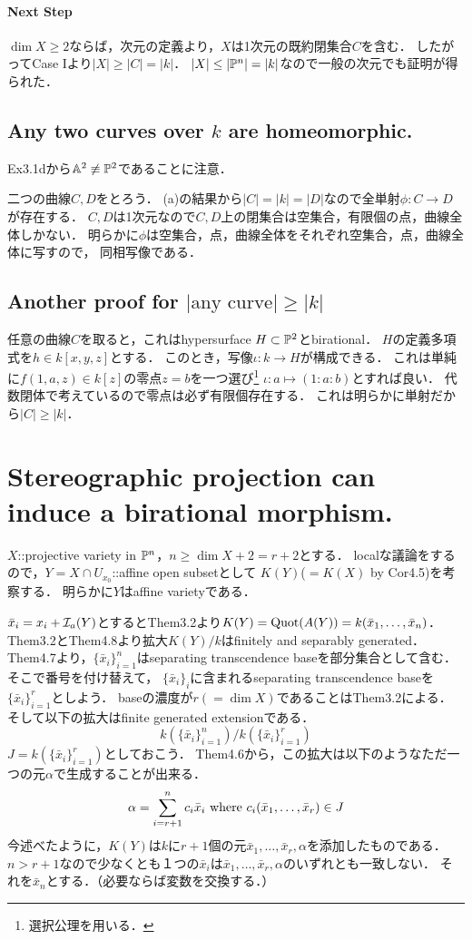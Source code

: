\documentclass[a4paper]{jsarticle}
\begin{document}
    \paragraph{Next Step}
    $\dim X \geq 2$ならば，次元の定義より，$X$は1次元の既約閉集合$C$を含む．
    したがってCase Iより$|X| \geq |C|=|k|$．
    $|X| \leq |\mathbb{P}^n|=|k|$なので一般の次元でも証明が得られた．

    \subsection{Any two curves over $k$ are homeomorphic.}
    Ex3.1dから$\mathbb{A}^2 \not \equiv \mathbb{P}^2$であることに注意．

    二つの曲線$C,D$をとろう．
    (a)の結果から$|C|=|k|=|D|$なので全単射$\phi:C \to D$が存在する．
    $C,D$は1次元なので$C,D$上の閉集合は空集合，有限個の点，曲線全体しかない．
    明らかに$\phi$は空集合，点，曲線全体をそれぞれ空集合，点，曲線全体に写すので，
    同相写像である．

    \subsection{Another proof for $|\text{any curve}| \geq |k|$}
    任意の曲線$C$を取ると，これはhypersurface $H \subset \mathbb{P}^2$とbirational．
    $H$の定義多項式を$h \in k[x,y,z]$とする．
    このとき，写像$\iota: k \to H$が構成できる．
    これは単純に$f(1,a,z) \in k[z]$の零点$z=b$を一つ選び\footnote{選択公理を用いる．}
    $\iota: a \mapsto (1:a:b)$とすれば良い．
    代数閉体で考えているので零点は必ず有限個存在する．
    これは明らかに単射だから$|C| \geq |k|$．

\section{Stereographic projection can induce a birational morphism.} %
    $X$::projective variety in $\mathbb{P}^n$，$n \geq \dim X+2=r+2$とする．
    localな議論をするので，$Y=X \cap U_{x_0}$::affine open subsetとして
    $K(Y)$($=K(X)$ by Cor4.5)を考察する．
    明らかに$Y$はaffine varietyである．

    $\bar{x}_i=x_i+\mathcal{I}_a(Y)$とするとThem3.2より$K(Y)=\operatorname{Quot}(A(Y))=k(\bar{x}_1,\dots,\bar{x}_n)$．
    Them3.2とThem4.8より拡大$K(Y)/k$はfinitely and separably generated．
    Them4.7より，$\{\bar{x}_i\}_{i=1}^n$はseparating transcendence baseを部分集合として含む．
    そこで番号を付け替えて，
    $\{\bar{x}_i\}_i$に含まれるseparating transcendence baseを$\{\bar{x}_i\}_{i=1}^{r}$としよう．
    baseの濃度が$r(=\dim X)$であることはThem3.2による．
    そして以下の拡大はfinite generated extensionである．
    \[ k(\{\bar{x}_i\}_{i=1}^{n})/k(\{\bar{x}_i\}_{i=1}^{r}) \]
    $J=k(\{\bar{x}_i\}_{i=1}^{r})$としておこう．
    Them4.6から，この拡大は以下のようなただ一つの元$\alpha$で生成することが出来る．
    \[ \alpha=\sum_{i=r+1}^{n}{c_i \bar{x}_i} \text{ where } c_i(\bar{x}_1,\dots,\bar{x}_r) \in J \]
    今述べたように，$K(Y)$は$k$に$r+1$個の元$\bar{x}_1, \dots, \bar{x}_r, \alpha$を添加したものである．
    $n>r+1$なので少なくとも１つの$\bar{x}_i$は$\bar{x}_1, \dots, \bar{x}_r, \alpha$のいずれとも一致しない．
    それを$\bar{x}_n$とする．（必要ならば変数を交換する．）
\end{document}
